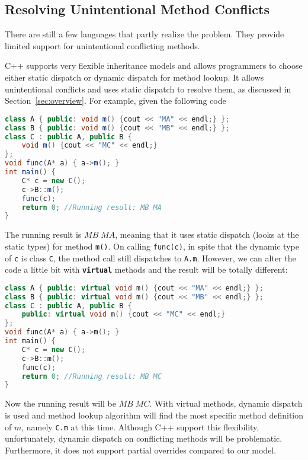 \subsection{Resolving Unintentional Method Conflicts}
There are still a few languages that partly realize the problem. They provide limited support for unintentional conflicting methods. 

C++ supports very flexible inheritance models and allows programmers to choose either static dispatch or dynamic dispatch for method lookup.
It allows unintentional conflicts and uses static dispatch to resolve them, as discussed in Section~\ref{sec:overview}. For example, given the following code
\begin{lstlisting}[language=Java]
class A { public: void m() {cout << "MA" << endl;} };
class B { public: void m() {cout << "MB" << endl;} };
class C : public A, public B { 
	void m() {cout << "MC" << endl;}
};
void func(A* a) { a->m(); }
int main() {
	C* c = new C();
	c->B::m();
	func(c); 
	return 0; //Running result: MB MA
}
\end{lstlisting}
The running result is $MB \; MA$, meaning that it uses static dispatch (looks at the static types) for method \lstinline|m()|. 
On calling \texttt{func(c)}, in spite that the dynamic type of \texttt{c} is class \texttt{C}, the method call still dispatches to 
\lstinline|A.m|.
However, we can alter the code a little bit with \textbf{\texttt{virtual}} methods and the result will be totally different:
\begin{lstlisting}[language=c++]
class A { public: virtual void m() {cout << "MA" << endl;} };
class B { public: virtual void m() {cout << "MB" << endl;} };
class C : public A, public B { 
    public: virtual void m() {cout << "MC" << endl;}
};
void func(A* a) { a->m(); }
int main() {
	C* c = new C();
	c->B::m();
	func(c); 
	return 0; //Running result: MB MC
}
\end{lstlisting}
Now the running result will be $MB \; MC$. With virtual methods, dynamic dispatch is used and 
method lookup algorithm will find the most specific method definition of $m$, namely \lstinline|C.m| at this time.
Although C++ support this flexibility, unfortunately, dynamic dispatch on conflicting methods will be problematic.
Furthermore, it does not support partial overrides compared to our model.

\begin{lstlisting}
\end{lstlisting}

